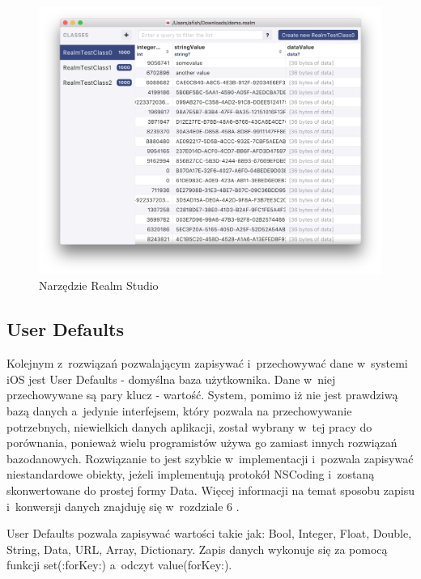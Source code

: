 \begin{figure}[h]
	\includegraphics[width=\linewidth]{img/RealmStudio.png}
	\caption{Narzędzie Realm Studio}
	\label{fig: RealmStudio}
\end{figure}

\subsection{User Defaults}

Kolejnym z~rozwiązań pozwalającym zapisywać i~przechowywać dane w~systemi iOS jest User Defaults - domyślna baza użytkownika. Dane w~niej przechowywane są pary klucz - wartość. System, pomimo iż nie jest prawdziwą bazą danych a~jedynie interfejsem, który pozwala na przechowywanie potrzebnych, niewielkich danych aplikacji, został wybrany w~tej pracy do porównania, ponieważ wielu programistów używa go zamiast innych rozwiązań bazodanowych. Rozwiązanie to jest szybkie w~implementacji i~pozwala zapisywać niestandardowe obiekty, jeżeli implementują protokół NSCoding i~zostaną skonwertowane do prostej formy Data. Więcej informacji na temat sposobu zapisu i~konwersji danych znajduję się w~rozdziale 6 . \par
  
User Defaults pozwala zapisywać wartości takie jak: Bool, Integer, Float, Double, String, Data, URL, Array, Dictionary. Zapis danych wykonuje się za pomocą funkcji set(:forKey:) a~odczyt value(forKey:). 